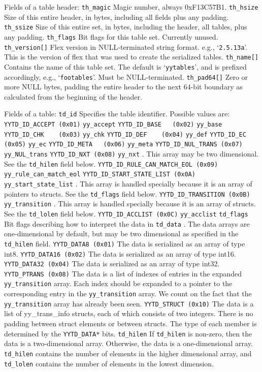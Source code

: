 \documentclass[openany,oneside]{book}
\begin{document}
Fields of a table header: \verb`th_magic` Magic number, always 0xF13C57B1. \verb`th_hsize` Size of this entire header, in bytes, including all fields plus any padding. \verb`th_ssize` Size of this entire set, in bytes, including the header, all tables, plus
any padding. \verb`th_flags` Bit flags for this table set. Currently unused. \verb`th_version[]` Flex version in NULL-terminated string format. e.g., ‘\verb`2.5.13a`’. This is
the version of flex that was used to create the serialized tables. \verb`th_name[]` Contains the name of this table set. The default is ‘\verb`yytables`’,
and is prefixed accordingly, e.g., ‘\verb`footables`’. Must be NULL-terminated. \verb`th_pad64[]` Zero or more NULL bytes, padding the entire header to the next 64-bit boundary
as calculated from the beginning of the header.

Fields of a table: \verb`td_id` Specifies the table identifier. Possible values are: \verb`YYTD_ID_ACCEPT (0x01)`  \verb`yy_accept`  \verb`YYTD_ID_BASE   (0x02)`  \verb`yy_base`  \verb`YYTD_ID_CHK    (0x03)`  \verb`yy_chk`  \verb`YYTD_ID_DEF    (0x04)`  \verb`yy_def`  \verb`YYTD_ID_EC     (0x05)`  \verb`yy_ec`  \verb`YYTD_ID_META   (0x06)`  \verb`yy_meta`  \verb`YYTD_ID_NUL_TRANS (0x07)`  \verb`yy_NUL_trans`  \verb`YYTD_ID_NXT (0x08)`  \verb`yy_nxt` . This array may be two dimensional. See the \verb`td_hilen` field below. \verb`YYTD_ID_RULE_CAN_MATCH_EOL (0x09)`  \verb`yy_rule_can_match_eol`  \verb`YYTD_ID_START_STATE_LIST (0x0A)`  \verb`yy_start_state_list` . This array is handled specially because it is an
array of pointers to structs. See the \verb`td_flags` field below. \verb`YYTD_ID_TRANSITION (0x0B)`  \verb`yy_transition` . This array is handled specially because it is an array of
structs. See the \verb`td_lolen` field below. \verb`YYTD_ID_ACCLIST (0x0C)`  \verb`yy_acclist`  \verb`td_flags` Bit flags describing how to interpret the data in \verb`td_data` . 
The data arrays are one-dimensional by default, but may be
two dimensional as specified in the \verb`td_hilen` field. \verb`YYTD_DATA8 (0x01)` The data is serialized as an array of type int8. \verb`YYTD_DATA16 (0x02)` The data is serialized as an array of type int16. \verb`YYTD_DATA32 (0x04)` The data is serialized as an array of type int32. \verb`YYTD_PTRANS (0x08)` The data is a list of indexes of entries in the expanded \verb`yy_transition` array.  Each index should be expanded to a pointer to the corresponding entry
in the \verb`yy_transition` array. We count on the fact that the \verb`yy_transition` array has already been seen. \verb`YYTD_STRUCT (0x10)` The data is a list of yy\_{}trans\_{}info structs, each of which consists of
two integers. There is no padding between struct elements or between structs. 
The type of each member is determined by the \verb`YYTD_DATA*` bits. \verb`td_hilen` If \verb`td_hilen` is non-zero, then the data is a two-dimensional array. 
Otherwise, the data is a one-dimensional array. \verb`td_hilen` contains the
number of elements in the higher dimensional array, and \verb`td_lolen` contains
the number of elements in the lowest dimension.
\end{document}
